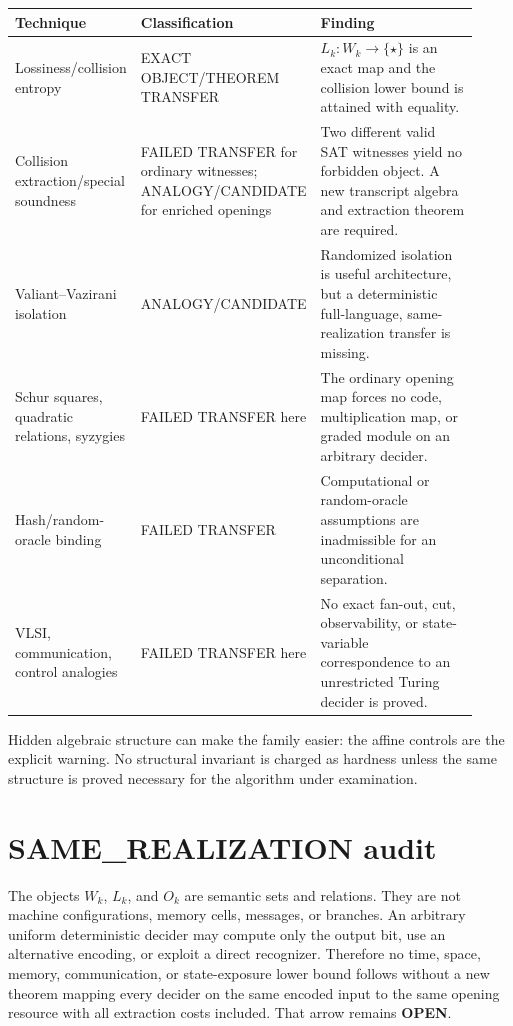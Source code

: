 \documentclass[11pt]{article}
\newcommand{\status}[1]{\textbf{#1}}
\begin{document}
\begin{center}
\begin{tabular}{p{0.27\linewidth}p{0.22\linewidth}p{0.43\linewidth}}
\toprule
Technique & Classification & Finding \\
\midrule
Lossiness/collision entropy & EXACT OBJECT/THEOREM TRANSFER & $L_k:W_k\to\{\star\}$ is an exact map and the collision lower bound is attained with equality. \\
Collision extraction/special soundness & FAILED TRANSFER for ordinary witnesses; ANALOGY/CANDIDATE for enriched openings & Two different valid SAT witnesses yield no forbidden object.  A new transcript algebra and extraction theorem are required. \\
Valiant--Vazirani isolation & ANALOGY/CANDIDATE & Randomized isolation is useful architecture, but a deterministic full-language, same-realization transfer is missing. \\
Schur squares, quadratic relations, syzygies & FAILED TRANSFER here & The ordinary opening map forces no code, multiplication map, or graded module on an arbitrary decider. \\
Hash/random-oracle binding & FAILED TRANSFER & Computational or random-oracle assumptions are inadmissible for an unconditional separation. \\
VLSI, communication, control analogies & FAILED TRANSFER here & No exact fan-out, cut, observability, or state-variable correspondence to an unrestricted Turing decider is proved. \\
\bottomrule
\end{tabular}
\end{center}

Hidden algebraic structure can make the family easier: the affine controls are
the explicit warning.  No structural invariant is charged as hardness unless
the same structure is proved necessary for the algorithm under examination.

\section*{SAME\_REALIZATION audit}

The objects $W_k$, $L_k$, and $O_k$ are semantic sets and relations.  They are
not machine configurations, memory cells, messages, or branches.  An arbitrary
uniform deterministic decider may compute only the output bit, use an
alternative encoding, or exploit a direct recognizer.  Therefore no time,
space, memory, communication, or state-exposure lower bound follows without a
new theorem mapping every decider on the same encoded input to the same
opening resource with all extraction costs included.  That arrow remains
\status{OPEN}.
\end{document}
